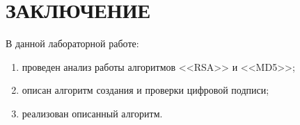 \chapter*{ЗАКЛЮЧЕНИЕ}

В данной лабораторной работе:

\begin{enumerate}[label=---]
    \item проведен анализ работы алгоритмов <<RSA>> и <<MD5>>;
    \item описан алгоритм создания и проверки цифровой подписи;
    \item реализован описанный алгоритм.
\end{enumerate}
